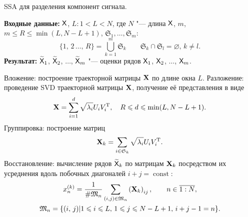 \documentclass[specialist,
    substylefile = spbu.rtx,
    subf,href,colorlinks=true, 12pt]{disser}
\theoremstyle{plain}
\theoremstyle{definition}
\theoremstyle{remark}
\newcommand{\Input}{\textbf{Входные данные: }}
\newcommand{\Output}{\textbf{Результат: }}
\begin{document}
    \begin{algorithm}[!h]
        \caption{SSA для разделения компонент сигнала.}
        \label{alg:ssa-components}
        \Input $\mathsf{X}$, $L: 1 < L < N$, где $N$ "--- длина $\mathsf{X}$, $m$, $m \leqslant R\leqslant \min(L, N-L+1)$,
        $\mathfrak{S}_1, \ldots, \mathfrak{S}_m$:
        \[
            \{1,\, 2\,\ldots,\, R\}=\bigcup_{k=1}^{m}\mathfrak{S}_k \qquad \mathfrak{S}_k\cap \mathfrak{S}_l =\varnothing,\, 
            k\ne l.
        \]
        \Output $\widetilde{\mathsf{X}}_1$, $\widetilde{\mathsf{X}}_2$, $\ldots$, $\widetilde{\mathsf{X}}_m$ "--- оценки рядов 
        $\mathsf{X}_1$, $\mathsf{X}_2$, $\ldots$, $\mathsf{X}_m$.
        \begin{algorithmic}[1]
            \State Вложение: построение траекторной матрицы $\mathbf{X}$ по длине окна $L$.
            \State Разложение: проведение SVD траекторной матрицы $\mathbf{X}$, получение её представления в виде
            \begin{equation*}
                \mathbf{X}=\sum_{i=1}^{d} \sqrt{\lambda_i} U_i V_i^{\mathrm{T}}, \quad R \leqslant d \leqslant \min(L, N-L+1).
            \end{equation*}
            \State Группировка: построение матриц
            \begin{equation*}
                \mathbf{X}_k=\sum_{i \in \mathfrak{S}_k} \sqrt{\lambda_i} U_i V_i^{\mathrm{T}}.
            \end{equation*}
            \State Восстановление: вычисление рядов $\widetilde{\mathsf{X}}_k$ по матрицам $\mathbf{X}_k$ посредством их усреднения 
            вдоль побочных диагоналей $i + j =\operatorname{const}$:
            \begin{gather*}
                x^{(k)}_n=\frac{1}{\#\mathfrak{M}_n}\sum_{(i,j)\in \mathfrak{M}_n} 
                \left(\mathbf{X}_k\right)_{ij},\qquad n\in \overline{1:N},\\
                \mathfrak{M}_n=\{(i,\, j) | 1\leqslant i \leqslant L,\, 1\leqslant j \leqslant N-L+1,\, i+j-1=n\}.
            \end{gather*}
        \end{algorithmic}
    \end{algorithm}
    
\end{document}
